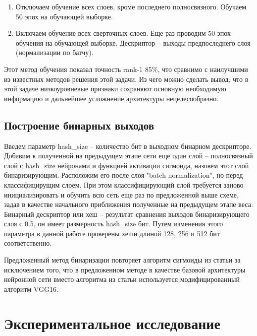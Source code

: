 \documentclass[a4paper]{article}
\begin{document}
\begin{multicols*}{2}
\begin{enumerate}
    \item Отключаем обучение всех слоев, кроме последнего полносвязного.  Обучаем 50 эпох на обучающей выборке. 
    \item Включаем обучение всех сверточных слоев. Еще раз проводим 50 эпох обучения на обучающей выборке. Дескриптор -- выходы предпоследнего слоя (нормализации по батчу).
\end{enumerate}

Этот метод обучения показал точность rank-1 85\%, что сравнимо с наилучшими из известных методов решения этой задачи. Из чего можно сделать вывод, что в этой задаче низкоуровневые признаки сохраняют основную необходимую информацию и дальнейшее усложнение архитектуры нецелесообразно.

\subsection{Построение бинарных выходов}

Введем параметр hash\_size -- количество бит в выходном бинарном дескрипторе. Добавим к полученной на предыдущем этапе сети еще один слой -- полносвязный слой с hash\_size нейронами и функцией активации сигмоида, назовем этот слой бинаризирующим. Расположим его после слоя "batch normalization", но перед классифицирущим слоем. При этом классифицирующий слой требуется заново инициализировать и обучить всю сеть еще раз по предложенной выше схеме, задав в качестве начального приближения полученные на предыдущем этапе веса. Бинарный дескриптор или хеш -- результат сравнения выходов бинаризирующего слоя с 0.5, он имеет размерность hash\_size бит. Путем изменения этого параметра в данной работе проверены хеши длиной 128, 256 и 512 бит соответственно.

Предложенный метод бинаризации повторяет алгоритм сигмоиды из статьи \cite{deephash} за исключением того, что в предложенном методе в качестве базовой архитектуры нейронной сети вместо алгоритма из статьи используется модифицированный алгоритм VGG16.

\section{Экспериментальное исследование}


\end{multicols*}
\end{document}
